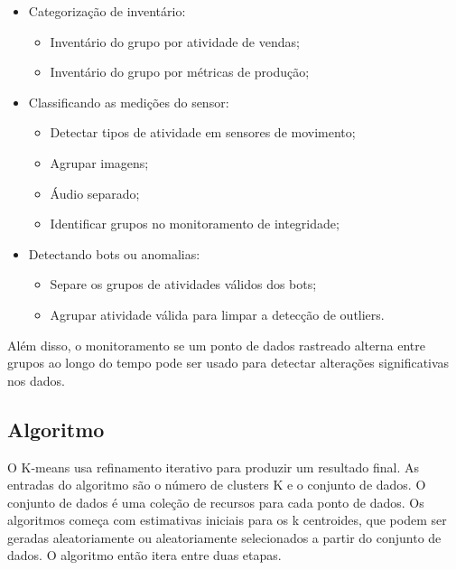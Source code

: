 \documentclass[12pt]{article}
\begin{document}
\begin{itemize}
	\item Categorização de inventário:
	\begin{itemize}
		\item Inventário do grupo por atividade de vendas;
		\item Inventário do grupo por métricas de produção;
	\end{itemize}
\end{itemize}

\begin{itemize}
	\item Classificando as medições do sensor:
	\begin{itemize}
		\item Detectar tipos de atividade em sensores de movimento;
		\item Agrupar imagens;
		\item Áudio separado;
		\item Identificar grupos no monitoramento de integridade;
	\end{itemize}
\end{itemize}

\begin{itemize}
	\item Detectando bots ou anomalias:
	\begin{itemize}
		\item Separe os grupos de atividades válidos dos bots;
		\item Agrupar atividade válida para limpar a detecção de outliers.
	\end{itemize}
\end{itemize}

Além disso, o monitoramento se um ponto de dados rastreado alterna entre grupos ao longo do tempo pode ser usado para detectar alterações significativas nos dados.
\subsection{Algoritmo}
O K-means usa refinamento iterativo para produzir um resultado final. As entradas do algoritmo são o número de clusters K e o conjunto de dados. O conjunto de dados é uma coleção de recursos para cada ponto de dados. Os algoritmos começa com estimativas iniciais para os k  centroides, que podem ser geradas aleatoriamente ou aleatoriamente selecionados a partir do conjunto de dados. O algoritmo então itera entre duas etapas.
\end{document}
